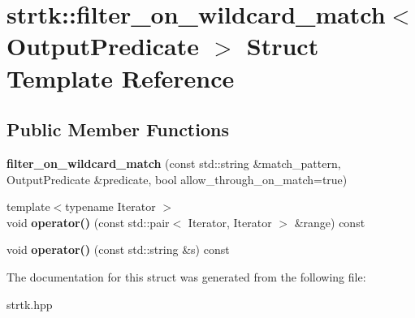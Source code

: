 \hypertarget{structstrtk_1_1filter__on__wildcard__match}{\section{strtk\-:\-:filter\-\_\-on\-\_\-wildcard\-\_\-match$<$ Output\-Predicate $>$ Struct Template Reference}
\label{structstrtk_1_1filter__on__wildcard__match}
}
\subsection*{Public Member Functions}
\begin{DoxyCompactItemize}
\item 
\hypertarget{structstrtk_1_1filter__on__wildcard__match_a8cd187af8317197d2d740c0abe00aaec}{{\bfseries filter\-\_\-on\-\_\-wildcard\-\_\-match} (const std\-::string \&match\-\_\-pattern, Output\-Predicate \&predicate, bool allow\-\_\-through\-\_\-on\-\_\-match=true)}\label{structstrtk_1_1filter__on__wildcard__match_a8cd187af8317197d2d740c0abe00aaec}

\item 
\hypertarget{structstrtk_1_1filter__on__wildcard__match_a8482b3e530f3bf22f2d0406a96a109ab}{{\footnotesize template$<$typename Iterator $>$ }\\void {\bfseries operator()} (const std\-::pair$<$ Iterator, Iterator $>$ \&range) const }\label{structstrtk_1_1filter__on__wildcard__match_a8482b3e530f3bf22f2d0406a96a109ab}

\item 
\hypertarget{structstrtk_1_1filter__on__wildcard__match_aab3b857999492671d37e4a6d76470c5f}{void {\bfseries operator()} (const std\-::string \&s) const }\label{structstrtk_1_1filter__on__wildcard__match_aab3b857999492671d37e4a6d76470c5f}

\end{DoxyCompactItemize}


The documentation for this struct was generated from the following file\-:\begin{DoxyCompactItemize}
\item 
strtk.\-hpp\end{DoxyCompactItemize}
